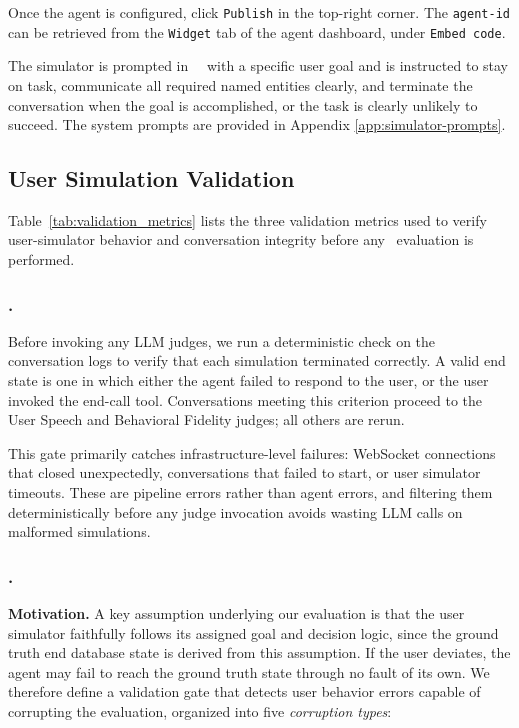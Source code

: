 Once the agent is configured, click \texttt{Publish} in the top-right corner. The \texttt{agent-id} can be retrieved from the \texttt{Widget} tab of the agent dashboard, under \texttt{Embed code}.

The simulator is prompted in ~\framework~with a specific user goal and is instructed to stay on task, communicate all required named entities clearly, and terminate the conversation when the goal is accomplished, or the task is clearly unlikely to succeed. The system prompts are provided in Appendix \ref{app:simulator-prompts}.



\subsection{User Simulation Validation}

Table~\ref{tab:validation_metrics} lists the three validation metrics used to verify user-simulator behavior and conversation integrity before any \framework~evaluation is performed.

\subsubsection{\metricvalidend.}
Before invoking any LLM judges, we run a deterministic check on the conversation logs to verify that each simulation terminated correctly. A valid end state is one in which either the agent failed to respond to the user, or the user invoked the end-call tool. Conversations meeting this criterion proceed to the User Speech and Behavioral Fidelity judges; all others are rerun.

This gate primarily catches infrastructure-level failures: WebSocket connections that closed unexpectedly, conversations that failed to start, or user simulator timeouts. These are pipeline errors rather than agent errors, and filtering them deterministically before any judge invocation avoids wasting LLM calls on malformed simulations.

\subsubsection{\metricbehavior.}

\textbf{Motivation.}
A key assumption underlying our evaluation is that the user simulator faithfully follows its assigned goal and decision logic, since the ground truth end database state is derived from this assumption. If the user deviates, the agent may fail to reach the ground truth state through no fault of its own. We therefore define a validation gate that detects user behavior errors capable of corrupting the evaluation, organized into five \emph{corruption types}:

